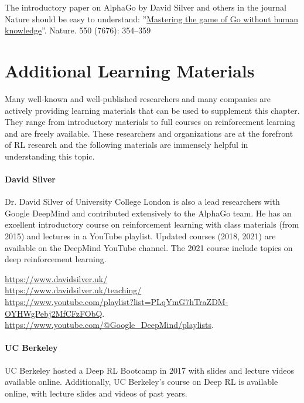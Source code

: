 The introductory paper on AlphaGo by David Silver and others in the journal Nature should be easy to understand: ''\href{https://www.nature.com/articles/nature24270}{Mastering the game of Go without human knowledge}''. Nature. 550 (7676): 354--359

\section{Additional Learning Materials}

Many well-known and well-published researchers and many companies are actively providing learning materials that can be used to supplement this chapter. They range from introductory materials to full courses on reinforcement learning and are freely available. These researchers and organizations are at the forefront of RL research and the following materials are immensely helpful in understanding this topic.

\paragraph*{David Silver}
Dr. David Silver of University College London is also a lead researchers with Google DeepMind and contributed extensively to the AlphaGo team. He has an excellent introductory course on reinforcement learning with class materials (from 2015) and lectures in a YouTube playlist. Updated courses (2018, 2021) are available on the DeepMind YouTube channel. The 2021 course include topics on deep reinforcement learning. \\

\begin{tcolorbox}[colback=code]
\footnotesize
\url{https://www.davidsilver.uk/} \\

\url{https://www.davidsilver.uk/teaching/} \\

\url{https://www.youtube.com/playlist?list=PLqYmG7hTraZDM-OYHWgPebj2MfCFzFObQ}. \\

\url{https://www.youtube.com/@Google_DeepMind/playlists}.
\end{tcolorbox}

\paragraph*{UC Berkeley}

UC Berkeley hosted a Deep RL Bootcamp in 2017 with slides and lecture videos available online. Additionally, UC Berkeley's course on Deep RL is available online, with lecture slides and videos of past years.

